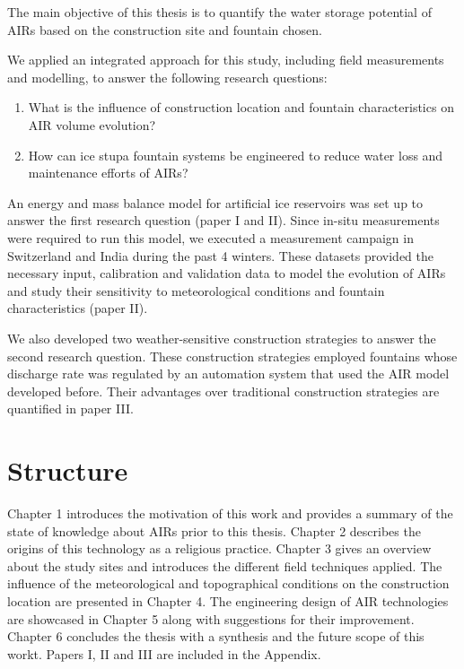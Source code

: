 The main objective of this thesis is to quantify the water storage potential of AIRs based on the construction
site and fountain chosen. 

We applied an integrated approach for this study, including field measurements and modelling, to answer the
following research questions: 

\begin{enumerate}

\item What is the influence of construction location and fountain characteristics on AIR volume evolution? 

\item How can ice stupa fountain systems be engineered to reduce water loss and maintenance efforts of AIRs?

\end{enumerate}

An energy and mass balance model for artificial ice reservoirs was set up to answer the first research question
(paper I and II). Since in-situ measurements were required to run this model, we executed a measurement campaign
in Switzerland and India during the past 4 winters. These datasets provided the necessary input, calibration and
validation data to model the evolution of AIRs and study their sensitivity to meteorological conditions and
fountain characteristics (paper II). 

We also developed two weather-sensitive construction strategies to answer the second research question. These
construction strategies employed fountains whose discharge rate was regulated by an automation system that used
the AIR model developed before. Their advantages over traditional construction strategies are quantified in
paper III.

\section{Structure}

Chapter 1 introduces the motivation of this work and provides a summary of the state of knowledge about AIRs
prior to this thesis. Chapter 2 describes the origins of this technology as a religious practice. Chapter 3
gives an overview about the study sites and introduces the different field techniques applied. The influence of
the meteorological and topographical conditions on the construction location are presented in Chapter 4. The
engineering design of AIR technologies are showcased in Chapter 5 along with suggestions for their improvement.
Chapter 6 concludes the thesis with a synthesis and the future scope of this workt. Papers I, II and III are included in the
Appendix.


